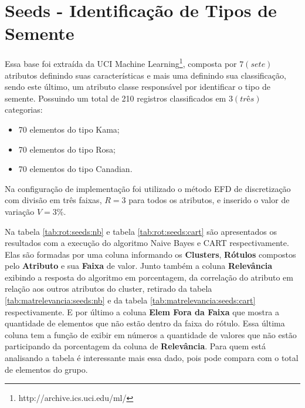 \section{Seeds - Identificação de Tipos de Semente}
Essa base foi extraída da UCI Machine Learning\footnote{http://archive.ics.uci.edu/ml/}, composta por ${7(sete)}$ atributos definindo suas características e mais uma definindo sua classificação, sendo este último, um atributo classe  responsável por identificar o tipo de semente. Possuindo um total de 210 registros classificados em ${3(três)}$ categorias:
\begin{itemize}[noitemsep]
 \item 70 elementos do tipo Kama;
 \item 70 elementos do tipo Rosa;
 \item 70 elementos do tipo Canadian.
\end{itemize}
Na configuração de implementação foi utilizado o método EFD de discretização com divisão em três faixas, ${R=3}$ para todos os atributos, e inserido o valor de variação ${V=3\%}$.

Na tabela \ref{tab:rot:seeds:nb} e tabela \ref{tab:rot:seeds:cart} são  apresentados os resultados com a execução do algoritmo Naive Bayes e CART respectivamente. Elas são formadas por uma coluna informando os \textbf{Clusters}, \textbf{Rótulos}  compostos pelo \textbf{Atributo} e sua \textbf{Faixa} de valor. Junto também a coluna \textbf{Relevância} exibindo a resposta do algoritmo em porcentagem, da correlação do atributo em relação aos outros atributos do cluster, retirado da tabela \ref{tab:matrelevancia:seeds:nb} e da tabela \ref{tab:matrelevancia:seeds:cart} respectivamente. E por último a coluna \textbf{Elem Fora da Faixa} que mostra a quantidade de elementos que não estão dentro da faixa do rótulo. Essa última coluna tem a função de exibir em números a quantidade de valores que não estão participando da porcentagem da coluna de \textbf{Relevância}. Para quem está analisando a tabela é interessante mais essa dado, pois pode compara com o total de elementos do grupo.

